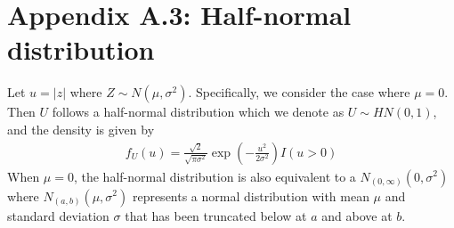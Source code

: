 \documentclass[11pt]{article}
\begin{document}
\section*{Appendix A.3: Half-normal distribution}
Let $u = |z|$ where $Z \sim N(\mu, \sigma^2)$.
Specifically, we consider the case where $\mu = 0$. Then $U$ follows a half-normal distribution which we denote as $U \sim HN(0, 1)$, and the density is given by
\begin{align}
  f_U(u) = \frac{ \sqrt{2} }{ \sqrt{\pi \sigma^2} } \exp \left( - \frac{ u^2 }{ 2 \sigma^2 } \right) I(u > 0)
\end{align}
When $\mu = 0$, the half-normal distribution is also equivalent to a $N_{(0, \infty)}(0, \sigma^2)$ where $N_{(a, b)}(\mu, \sigma^2)$ represents a normal distribution with mean $\mu$ and standard deviation $\sigma$ that has been truncated below at $a$ and above at $b$.



\end{document}
